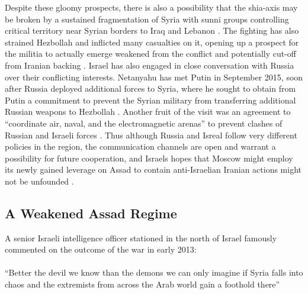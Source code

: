 \documentclass[a4paper]{article}\twocolumn
\begin{document}
Despite these gloomy prospects, there is also a possibility that the shia-axis may be broken by a sustained fragmentation of Syria with sunni groups controlling critical territory near Syrian borders to Iraq and Lebanon \cite{Hanauer2015}. The fighting has also strained Hezbollah and inflicted many casualties on it, opening up a prospect for the militia to actually emerge weakened from the conflict and potentially cut-off from Iranian backing \cite{Hanauer2015}. Israel has also engaged in close conversation with Russia over their conflicting interests. Netanyahu has met Putin in September 2015, soon after Russia deployed additional forces to Syria, where he sought to obtain from Putin a commitment to prevent the Syrian military from transferring additional Russian weapons to Hezbollah \cite{aronson_2017,Hanauer2015}. Another fruit of the visit was an agreement to “coordinate air, naval, and the electromagnetic arenas” to prevent clashes of Russian and Israeli forces \cite{yaakov2015}. Thus although Russia and Isreal follow very different policies in the region, the communication channels are open and warrant a possibility for future cooperation, and Israels hopes that Moscow might employ its newly gained leverage on Assad to contain anti-Israelian Iranian actions might not be unfounded \cite{Hanauer2015}.

\subsection{A Weakened Assad Regime}
A senior Israeli intelligence officer stationed in the north of Israel famously commented on the outcome of the war in early 2013: \\\\
“Better the devil we know than the demons we can only imagine if Syria falls into chaos and the extremists from across the Arab world gain a foothold there” \cite{frenkel_boyes_2013,timesofisrael_2013} \newline
\end{document}
